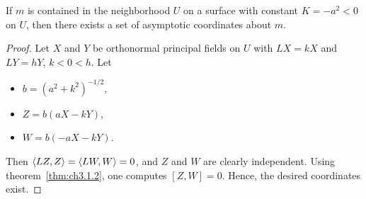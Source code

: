 \documentclass[../main]{subfiles}
\begin{document}
\begin{theorem} \label{thm:ch9.5.3}
    If $m$ is contained in the neighborhood $U$ on a surface with constant $K = -a^2 < 0$ on $U$, then there exists a set of asymptotic coordinates about $m$.
\end{theorem}

\begin{proof}
    Let $X$ and $Y$ be orthonormal principal fields on $U$ with $LX = kX$ and $LY = hY$, $k < 0 < h$. Let
    \begin{itemize}
        \item $b=(a^2+k^2)^{-1/2}$,
        \item $Z=b(aX-kY)$,
        \item $W=b(-aX-kY)$.
    \end{itemize}
    Then $\left\langle LZ,Z\right\rangle = \left\langle LW,W\right\rangle = 0$, and $Z$ and $W$ are clearly independent. Using theorem~\ref{thm:ch3.1.2}, one computes $[Z,W] = 0$. Hence, the desired coordinates exist.
\end{proof}
\end{document}
